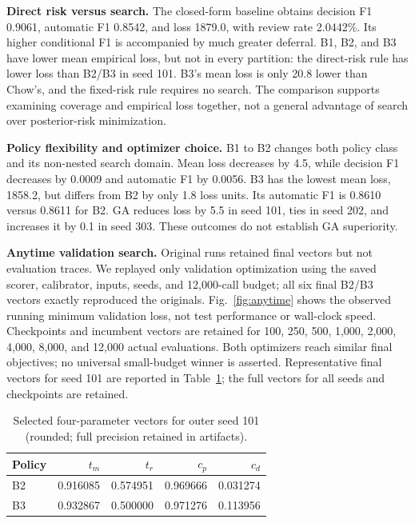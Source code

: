 \documentclass[conference]{IEEEtran}
\begin{document}
\textbf{Direct risk versus search.} The closed-form baseline obtains decision F1 0.9061, automatic F1 0.8542, and loss 1879.0, with review rate 2.0442\%. Its higher conditional F1 is accompanied by much greater deferral. B1, B2, and B3 have lower mean empirical loss, but not in every partition: the direct-risk rule has lower loss than B2/B3 in seed 101. B3's mean loss is only 20.8 lower than Chow's, and the fixed-risk rule requires no search. The comparison supports examining coverage and empirical loss together, not a general advantage of search over posterior-risk minimization.

\textbf{Policy flexibility and optimizer choice.} B1 to B2 changes both policy class and its non-nested search domain. Mean loss decreases by 4.5, while decision F1 decreases by 0.0009 and automatic F1 by 0.0056. B3 has the lowest mean loss, 1858.2, but differs from B2 by only 1.8 loss units. Its automatic F1 is 0.8610 versus 0.8611 for B2. GA reduces loss by 5.5 in seed 101, ties in seed 202, and increases it by 0.1 in seed 303. These outcomes do not establish GA superiority.

\textbf{Anytime validation search.} Original runs retained final vectors but not evaluation traces. We replayed only validation optimization using the saved scorer, calibrator, inputs, seeds, and 12,000-call budget; all six final B2/B3 vectors exactly reproduced the originals. Fig.~\ref{fig:anytime} shows the observed running minimum validation loss, not test performance or wall-clock speed. Checkpoints and incumbent vectors are retained for 100, 250, 500, 1,000, 2,000, 4,000, 8,000, and 12,000 actual evaluations. Both optimizers reach similar final objectives; no universal small-budget winner is asserted. Representative final vectors for seed 101 are reported in Table~\ref{tab:vectors}; the full vectors for all seeds and checkpoints are retained.

\begin{table}[t]
\caption{Selected four-parameter vectors for outer seed 101 (rounded; full precision retained in artifacts).}
\label{tab:vectors}
\centering
\begin{tabular}{lrrrr}
\toprule
Policy & $t_m$ & $t_r$ & $c_p$ & $c_d$\\
\midrule
B2 & 0.916085 & 0.574951 & 0.969666 & 0.031274\\
B3 & 0.932867 & 0.500000 & 0.971276 & 0.113956\\
\bottomrule
\end{tabular}
\end{table}
\end{document}
